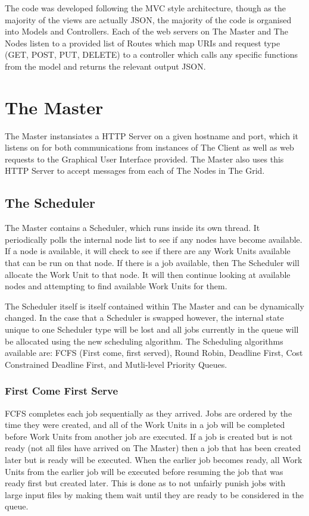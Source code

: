 The code was developed following the MVC style architecture, though as the majority of the views are actually JSON, the majority of the code is organised into Models and Controllers. Each of the web servers on The Master and The Nodes listen to a provided list of Routes which map URIs and request type (GET, POST, PUT, DELETE) to a controller which calls any specific functions from the model and returns the relevant output JSON.

\section{The Master}
The Master instansiates a HTTP Server on a given hostname and port, which it listens on for both communications from instances of The Client as well as web requests to the Graphical User Interface provided. The Master also uses this HTTP Server to accept messages from each of The Nodes in The Grid.

\subsection{The Scheduler}
The Master contains a Scheduler, which runs inside its own thread. It periodically polls the internal node list to see if any nodes have become available. If a node is available, it will check to see if there are any Work Units available that can be run on that node. If there is a job available, then The Scheduler will allocate the Work Unit to that node. It will then continue looking at available nodes and attempting to find available Work Units for them.

The Scheduler itself is itself contained within The Master and can be dynamically changed. In the case that a Scheduler is swapped however, the internal state unique to one Scheduler type will be lost and all jobs currently in the queue will be allocated using the new scheduling algorithm. The Scheduling algorithms available are: FCFS (First come, first served), Round Robin, Deadline First, Cost Constrained Deadline First, and Mutli-level Priority Queues.

\subsubsection{First Come First Serve}
FCFS completes each job sequentially as they arrived. Jobs are ordered by the time they were created, and all of the Work Units in a job will be completed before Work Units from another job are executed. If a job is created but is not ready (not all files have arrived on The Master) then a job that has been created later but is ready will be executed. When the earlier job becomes ready, all Work Units from the earlier job will be executed before resuming the job that was ready first but created later. This is done as to not unfairly punish jobs with large input files by making them wait until they are ready to be considered in the queue.

